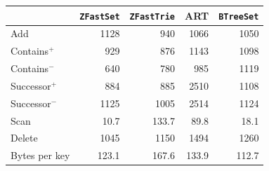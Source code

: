 \begin{tabular}{lrrrr}
&\multicolumn{1}{c}{\texttt{ZFastSet}}&\multicolumn{1}{c}{\texttt{ZFastTrie}}&\multicolumn{1}{c}{ART}&\multicolumn{1}{c}{\texttt{BTreeSet}}\\
\hline
Add & 1128 & 940 & 1066 & 1050\\
Contains$^+$ & 929 & 876 & 1143 & 1098\\
Contains$^-$ & 640 & 780 & 985 & 1119\\
Successor$^+$ & 884 & 885 & 2510 & 1108\\
Successor$^-$ & 1125 & 1005 & 2514 & 1124\\
Scan & 10.7 & 133.7 & 89.8 & 18.1\\
Delete & 1045 & 1150 & 1494 & 1260\\
\hline
Bytes per key & 123.1 & 167.6 & 133.9 & 112.7\\
\end{tabular}
